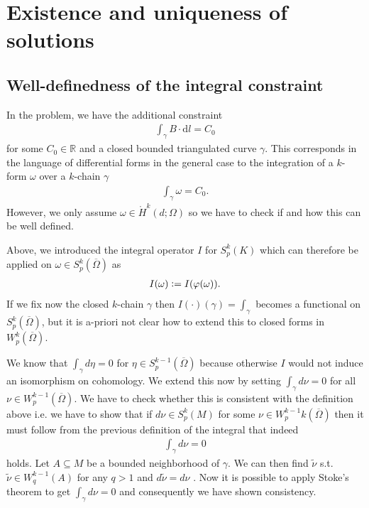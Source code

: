 \documentclass[12pt,a4paper]{article}
\theoremstyle{definition}
\newcommand{\omegabar}{\overline{\Omega}}
\newcommand{\real}{\mathbb{R}}
\begin{document}
\section{Existence and uniqueness of solutions}
\subsection{Well-definedness of the integral constraint} 
\label{well_definedness_integral}


In the problem, we have the additional constraint 
\begin{align*}
    \int_\gamma B \cdot \text{d}l = C_0
\end{align*}
for some $C_0 \in \real$ and a closed bounded triangulated curve $\gamma$.
This corresponds in the language of differential forms in the general case
to the integration of a $k$-form $\omega$
over a $k$-chain $\gamma$
\begin{align*}
    \int_\gamma \omega  = C_0.
\end{align*}
However, we only assume 
$\omega \in \mathring{H}^k(d;\Omega)$ so we have to check if and how this can
be well defined.

Above, we introduced the integral operator $I$ for $S^k_p(K)$ which can 
therefore be applied on $\omega \in S^k_p(\omegabar)$ as
\begin{align*}
    I(\omega) \vcentcolon= I (\varphi(\omega)).
\end{align*}
\noindent If we fix now the closed 
$k$-chain $\gamma$ then $I(\cdot)(\gamma) = \int_\gamma$ becomes a functional on
$S^k_p(\omegabar)$, but it is a-priori not clear how to extend this to closed forms in
$W_p^k(\omegabar)$. 

We know that $\int_\gamma d\eta = 0$ for $\eta \in S^{k-1}_p(\omegabar)$ because 
otherwise $I$ would not induce an isomorphism on cohomology. We extend this now
by setting $\int_\gamma d\nu = 0$ for all $\nu \in W^{k-1}_p(\omegabar)$. 
We have to check whether this is consistent with the definition above i.e. we
have to show that if $d\nu \in S^k_p(M)$ for some 
$\nu \in W_p^{k-1}k(\omegabar)$ then 
it must follow from the previous definition of the integral that indeed
\begin{align*}
    \int_\gamma d\nu = 0
\end{align*}
holds.
Let $A \subseteq M$ be a bounded neighborhood of $\gamma$. We can then find 
$\tilde{\nu}$ s.t.  $\tilde{\nu} \in W^{k-1}_q(A)$ for any $q > 1$ and 
$d\tilde{\nu} = d\nu$ \cite[Thm 3.1.1]{schwarz}. Now it is possible to apply 
Stoke's theorem \cite[Thm. 9]{goldshtein_integration} to get  
$\int_\gamma d\nu = 0$ and consequently we have shown consistency.
\end{document}
